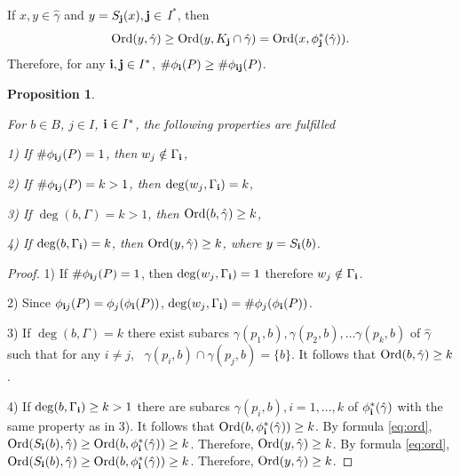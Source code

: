 \documentclass[11pt,reqno]{amsart}
\newtheorem{proposition}[theorem]{Proposition}
\newcommand{\Ord}{\mathop{\rm Ord}\nolimits}
\newcommand{\hga}{{\hat\gamma}}
\begin{document}
   If $x, y \in \hat{\gamma}$ and $y =S_{\bf{j}}(x), \bf{j} \in $ $I^*$, then 
   \begin{equation}\label{eq:ord}
{\mathop{\rm Ord} \nolimits}(y,\hga) \geq {\mathop{\rm Ord} \nolimits}(y,K_{\bf{j}} \cap \hga) =  {\mathop{\rm Ord} \nolimits}(x,\phi^*_{\bf{j}}(\hga)).
\end{equation}
Therefore, for any ${\bf i,j}\in I^*$,
      $\#\phi_{\bf{i}}(P) \geq \#\phi_{\bf{ij}}(P) $.


\begin{proposition}\label{ordim}
 
  For $b\in B$,  $j\in I$, ${\bf{i}}\in I^*$, the following properties are fulfilled 
  
  1) If $\#\phi_{{\bf{i}}j}
    (P)=1$, then $w_{j} \notin \Gamma_{\bf{i}}$,

   
  2) If $\#\phi_{{\bf{i}}j}
    (P)=k>1$, then $\deg(w_{j},\Gamma_{\bf{i}}) = k$,
    
     
    3)  If $\deg(b, \Gamma) = k>1$, then $\Ord(b,\hga) \geq k$, 
    
4) If $\deg(b, \Gamma_{\bf{i}}) =k $, then $\Ord(y,\hga) \ge  k$, where $y = S_{\bf{i}}(b)$.
\end{proposition}
\begin{proof}
  
1) If $\#\phi_{{\bf{i}}j}(P) = 1$, then $\deg(w_j, \Gamma_{\bf{i}}) = 1$ therefore $w_{j} \notin\Gamma_{\bf{i}}$.   

 2) Since $\phi_{{\bf{i}}j}(P) = \phi_{j}( \phi_{\bf{i}}(P))$,   $\deg(w_{j}, \Gamma_{\bf{i}}) = \#\phi_{j}(\phi_{\bf{i}}(P))$.


3) If $\deg(b, \Gamma) = k$  there exist  subarcs  $\gamma(p_1,b), \gamma(p_2,b),\dots \gamma(p_k,b)$ of $\hat{\gamma}$ such that for any $i\neq j$, \  $\gamma(p_i,b)\cap \gamma(p_j,b) = \{b\}$. It follows that $\Ord(b,\hga) \geq k$.


4)  If $\deg(b, \Gamma_{\bf{i}}) \geq k > 1$ there are subarcs $\gamma(p_i,b), i=1,...,k$ of $\phi^*_{\bf{i}}(\hat{\gamma})$ with the same property as in 3). It follows that $\Ord(b,\phi^*_{\bf{i}}(\hat{\gamma})) \ge k$. 
By formula \eqref{eq:ord}, 
$\Ord(S_{\bf{i}}(b),\hat{\gamma}) \ge\Ord(b,\phi^*_{\bf{i}}(\hat{\gamma})) \geq k$. Therefore, $\Ord(y,\hat{\gamma}) \ge  k$.
By formula \eqref{eq:ord}, 
$\Ord(S_{\bf{i}}(b),\hat{\gamma}) \ge  \Ord(b,\phi^*_{\bf{i}}(\hat{\gamma})) \geq k$. Therefore, ${\Ord} (y,\hat{\gamma}) \ge  k$.
\end{proof}
\end{document}
